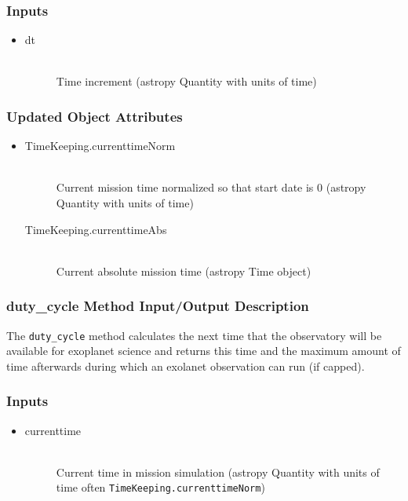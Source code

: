 \documentclass[cleanfoot]{asme2ej}
\begin{document}
\subsubsection*{Inputs}
\begin{itemize}
    \item 
    \begin{description}
        \item[dt] \hfill \\
        Time increment (astropy Quantity with units of time)
    \end{description}
\end{itemize}

\subsubsection*{Updated Object Attributes}
\begin{itemize}
    \item 
    \begin{description}
        \item[TimeKeeping.currenttimeNorm] \hfill \\
        Current mission time normalized so that start date is 0 (astropy Quantity with units of time)
        \item[TimeKeeping.currenttimeAbs] \hfill \\
        Current absolute mission time (astropy Time object)
    \end{description}
\end{itemize}

\subsubsection{duty\_cycle Method Input/Output Description} \label{sec:dutycycletask}
The \verb+duty_cycle+ method calculates the next time that the observatory will be available for exoplanet science and returns this time and the maximum amount of time afterwards during which an exolanet observation can run (if capped).

\subsubsection*{Inputs}
\begin{itemize}
    \item 
    \begin{description}
        \item[currenttime] \hfill \\
        Current time in mission simulation (astropy Quantity with units of time often \verb+TimeKeeping.currenttimeNorm+)
    \end{description}
\end{itemize}
\end{document}
